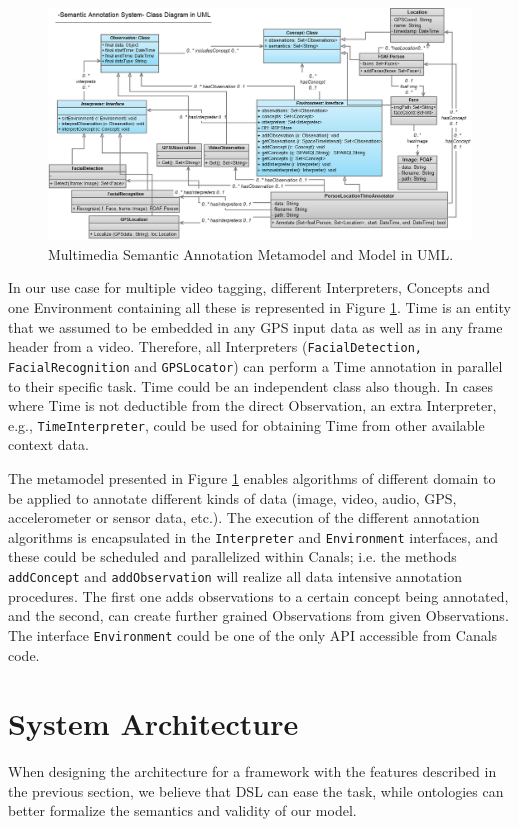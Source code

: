 \documentclass[[10pt,abbrv]{llncs}
\begin{document}
\begin{figure}[tb]
\centering
\includegraphics[width=12.5cm]{images/annotationUML.png}
\caption{Multimedia Semantic Annotation Metamodel and Model in UML.}
\label{fig:annotationUML}
\end{figure}

In our use case for multiple video tagging, different Interpreters, Concepts and one Environment containing all these is represented in Figure \ref{fig:annotationUML}. Time is an entity that we assumed to be embedded in any GPS input data as well as in any frame header from a video. Therefore, all Interpreters (\verb+FacialDetection, FacialRecognition+ and \verb+GPSLocator+) can perform a Time annotation in parallel to their specific task. Time could be an independent class also though. In cases where Time is not deductible from the direct Observation, an extra Interpreter, e.g., \verb+TimeInterpreter+, could be used for obtaining Time from other available context data.

The metamodel presented in Figure \ref{fig:annotationUML} enables algorithms of different domain to be applied to annotate different kinds of data (image, video, audio, GPS, accelerometer or sensor data, etc.). The execution of the different annotation algorithms is encapsulated in the \verb+Interpreter+ and \verb+Environment+ interfaces, and these could be scheduled and parallelized within Canals; i.e. the methods  \verb+addConcept+ and \verb+addObservation+ will realize all data intensive annotation procedures. The first one adds observations to a certain concept being annotated, and the second, can create further grained Observations from given Observations.
The interface \verb+Environment+ could be one of the only API accessible from Canals code.%

\section{System Architecture}
When designing the architecture for a framework with the features described in the previous section, we believe that DSL can ease the task, while ontologies can better formalize the semantics and validity of our model.
\end{document}
